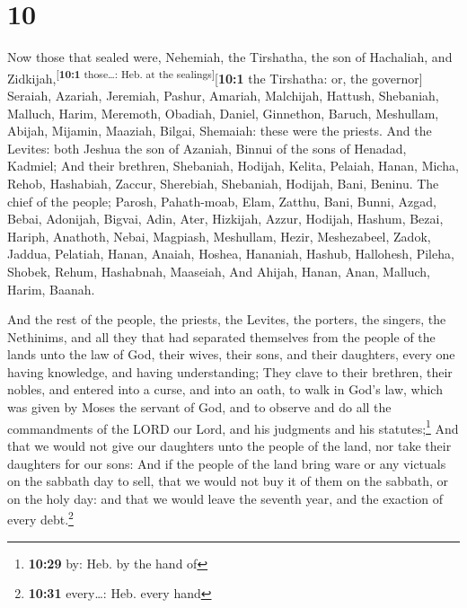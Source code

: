 \hypertarget{section-9}{%
\section{10}\label{section-9}}

 Now those that sealed were, Nehemiah, the Tirshatha, the
son of Hachaliah, and Zidkijah,\textsuperscript{{[}\textbf{10:1}
those\ldots: Heb. at the sealings{]}}{[}\textbf{10:1} the Tirshatha: or,
the governor{]}  Seraiah, Azariah, Jeremiah,
 Pashur, Amariah, Malchijah,  Hattush,
Shebaniah, Malluch,  Harim, Meremoth, Obadiah,
 Daniel, Ginnethon, Baruch,  Meshullam,
Abijah, Mijamin,  Maaziah, Bilgai, Shemaiah: these were
the priests.  And the Levites: both Jeshua the son of
Azaniah, Binnui of the sons of Henadad, Kadmiel;  And
their brethren, Shebaniah, Hodijah, Kelita, Pelaiah, Hanan,
 Micha, Rehob, Hashabiah,  Zaccur,
Sherebiah, Shebaniah,  Hodijah, Bani, Beninu.
 The chief of the people; Parosh, Pahath-moab, Elam,
Zatthu, Bani,  Bunni, Azgad, Bebai, 
Adonijah, Bigvai, Adin,  Ater, Hizkijah, Azzur,
 Hodijah, Hashum, Bezai,  Hariph,
Anathoth, Nebai,  Magpiash, Meshullam, Hezir,
 Meshezabeel, Zadok, Jaddua,  Pelatiah,
Hanan, Anaiah,  Hoshea, Hananiah, Hashub, 
Hallohesh, Pileha, Shobek,  Rehum, Hashabnah, Maaseiah,
 And Ahijah, Hanan, Anan,  Malluch, Harim,
Baanah.

 And the rest of the people, the priests, the Levites,
the porters, the singers, the Nethinims, and all they that had separated
themselves from the people of the lands unto the law of God, their
wives, their sons, and their daughters, every one having knowledge, and
having understanding;  They clave to their brethren,
their nobles, and entered into a curse, and into an oath, to walk in
God's law, which was given by Moses the servant of God, and to observe
and do all the commandments of the LORD our Lord, and his judgments and
his statutes;\footnote{\textbf{10:29} by: Heb. by the hand of}
 And that we would not give our daughters unto the people
of the land, nor take their daughters for our sons:  And
if the people of the land bring ware or any victuals on the sabbath day
to sell, that we would not buy it of them on the sabbath, or on the holy
day: and that we would leave the seventh year, and the exaction of every
debt.\footnote{\textbf{10:31} every\ldots: Heb. every hand}

